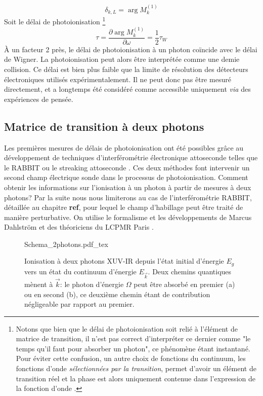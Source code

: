 \begin{equation}
\delta_{k,L} = \arg M^{(1)}_{k} 
\end{equation}
Soit le délai de photoionisation \footnote{Notons que bien que le délai de photoionisation soit relié à l'élément de matrice de transition, il n'est pas correct d'interpréter ce dernier comme "le temps qu'il faut pour absorber un photon", ce phénomène étant instantané. Pour éviter cette confusion, un autre choix de fonctions du continuum, les fonctions d'onde \textit{sélectionnées par la transition}, permet d'avoir un élément de transition réel et la phase est alors uniquement contenue dans l'expression de la fonction d'onde .}
\begin{equation}
\tau = \frac{\partial \arg M^{(1)}_{k}}{\partial \omega} = \frac{1}{2} \tau_W
\end{equation}
\`A un facteur 2 près, le délai de photoionisation à un photon coïncide avec le délai de Wigner. La photoionisation peut alors être interprétée comme une demie collision. Ce délai est bien plus faible que la limite de résolution des détecteurs électroniques utilisés expérimentalement. Il ne peut donc pas être mesuré directement, et a longtemps été considéré comme accessible uniquement \textit{via} des expériences de pensée.

\subsection{Matrice de transition à deux photons}
Les premières mesures de délais de photoionisation ont été possibles grâce au développement de techniques d'interférométrie électronique attoseconde telles que le RABBIT  ou le streaking attoseconde . Ces deux méthodes font intervenir un second champ électrique sonde dans le processus de photoionisation. Comment obtenir les informations sur l'ionisation à un photon à partir de mesures à deux photons? Par la suite nous nous limiterons au cas de l'interférométrie RABBIT, détaillée au chapitre \textbf{ref}, pour lequel le champ d'habillage peut être traité de manière perturbative. On utilise le formalisme et les développements de Marcus Dahlström et des théoriciens du LCPMR Paris .

\begin{figure}
\centering
\def\svgwidth{0.7\columnwidth}
{Schema_2photons.pdf_tex}
\caption{Ionisation à deux photons XUV-IR depuis l'état initial d'énergie $E_g$ vers un état du continuum d'énergie $E_{\vec{k}}$. Deux chemins quantiques mènent à $\vec{k}$: le photon d'énergie $\Omega$ peut être absorbé en premier (a) ou en second (b), ce deuxième chemin étant de contribution négligeable par rapport au premier.}
\label{fig:Schema_2photons}
\end{figure}

